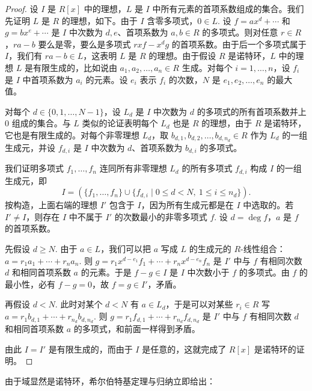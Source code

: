 \begin{proof}
设 \(I\) 是 \(R[x]\) 中的理想，\(L\) 是 \(I\) 中所有元素的首项系数组成的集合。我们先证明 \(L\) 是 \(R\) 的理想，如下。由于 \(I\) 含零多项式，\(0 \in L\). 设 \(f = ax^d + \cdots\) 和 \(g = bx^e + \cdots\) 是 \(I\) 中次数为 \(d, e\)、首项系数为 \(a, b \in R\) 的多项式。则对任意 \(r \in R\)，\(ra - b\) 要么是零，要么是多项式 \(rxf - x^dg\) 的首项系数。由于后一个多项式属于 \(I\)，我们有 \(ra - b \in L\)，这表明 \(L\) 是 \(R\) 的理想。由于假设 \(R\) 是诺特环，\(L\) 中的理想 \(L\) 是有限生成的，比如说由 \(a_1, a_2, \ldots, a_n \in R\) 生成。对每个 \(i = 1, \ldots, n\)，设 \(f_i\) 是 \(I\) 中首项系数为 \(a_i\) 的元素。设 \(e_i\) 表示 \(f_i\) 的次数，\(N\) 是 \(e_1, e_2, \ldots, e_n\) 的最大值。

对每个 \(d \in \{0, 1, \ldots, N-1\}\)，设 \(L_d\) 是 \(I\) 中次数为 \(d\) 的多项式的所有首项系数并上 0 组成的集合。与 \(L\) 类似的论证表明每个 \(L_d\) 也是 \(R\) 的理想，由于 \(R\) 是诺特环，它也是有限生成的。对每个非零理想 \(L_d\)，取 \(b_{d,1}, b_{d,2}, \ldots, b_{d,n_d} \in R\) 作为 \(L_d\) 的一组生成元，并设 \(f_{d,i}\) 是 \(I\) 中次数为 \(d\)、首项系数为 \(b_{d,i}\) 的多项式。

我们证明多项式 \(f_1, \ldots, f_n\) 连同所有非零理想 \(L_d\) 的所有多项式 \(f_{d,i}\) 构成 \(I\) 的一组生成元，即
\[
I = \left(\{f_1, \ldots, f_n\} \cup \{f_{d,i} \mid 0 \leq d < N,\ 1 \leq i \leq n_d\}\right).
\]
按构造，上面右端的理想 \(I'\) 包含于 \(I\)，因为所有生成元都是在 \(I\) 中选取的。若 \(I' \neq I\)，则存在 \(I\) 中不属于 \(I'\) 的次数最小的非零多项式 \(f\). 设 \(d = \deg f\)，\(a\) 是 \(f\) 的首项系数。

先假设 \(d \geq N\). 由于 \(a \in L\)，我们可以把 \(a\) 写成 \(L\) 的生成元的 \(R\)-线性组合：\(a = r_1a_1 + \cdots + r_na_n\). 则 \(g = r_1x^{d-e_1}f_1 + \cdots + r_nx^{d-e_n}f_n\) 是 \(I'\) 中与 \(f\) 有相同次数 \(d\) 和相同首项系数 \(a\) 的元素。于是 \(f - g \in I\) 是 \(I\) 中次数小于 \(f\) 的多项式。由 \(f\) 的最小性，必有 \(f - g = 0\)，故 \(f = g \in I'\)，矛盾。

再假设 \(d < N\). 此时对某个 \(d < N\) 有 \(a \in L_d\)，于是可以对某些 \(r_i \in R\) 写 \(a = r_1b_{d,1} + \cdots + r_{n_d}b_{d,n_d}\). 则 \(g = r_1f_{d,1} + \cdots + r_{n_d}f_{d,n_d}\) 是 \(I'\) 中与 \(f\) 有相同次数 \(d\) 和相同首项系数 \(a\) 的多项式，和前面一样得到矛盾。

由此 \(I = I'\) 是有限生成的，而由于 \(I\) 是任意的，这就完成了 \(R[x]\) 是诺特环的证明。
\end{proof}

由于域显然是诺特环，希尔伯特基定理与归纳立即给出：

